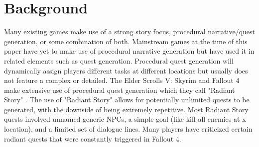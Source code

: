 \section{Background} \label{Background}
Many existing games make use of a strong story focus, procedural narrative/quest generation, or some combination of both. Mainstream games at the time of this paper have yet to make use of procedural narrative generation but have used it in related elements such as quest generation. Procedural quest generation will dynamically assign players different tasks at different locations but usually does not feature a complex or detailed. The Elder Scrolls V: Skyrim \cite{skyrim} and Fallout 4 \cite{hernandez_2016} make extensive use of procedural quest generation which they call "Radiant Story" \cite{radiantAI}. The use of "Radiant Story" allows for potentially unlimited quests to be generated, with the downside of being extremely repetitive. Most Radiant Story quests involved unnamed generic NPCs, a simple goal (like kill all enemies at x location), and a limited set of dialogue lines. Many players have criticized certain radiant quests that were constantly triggered in Fallout 4.
